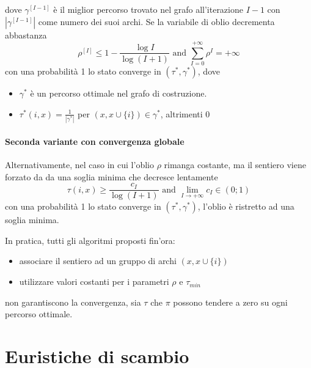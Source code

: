 \documentclass{article}
\begin{document}
dove $\gamma^{[I-1]}$ è il miglior percorso trovato nel grafo all'iterazione $I-1$ con
$|\gamma^{[I-1]}|$ come numero dei suoi archi. Se la variabile di oblio decrementa
abbastanza
$$\rho^{[I]}\leq 1-\frac{\log I}{\log (I+1)}\text{ and }\sum_{I=0}^{+\infty}\rho^{I}=+\infty$$
con una probabilità 1 lo stato converge in $(\tau^*,\gamma^*)$, dove
\begin{itemize}
    \item $\gamma^*$ è un percorso ottimale nel grafo di costruzione.
    \item $\tau^*(i,x)=\frac{1}{|\gamma^*|}$ per $(x,x\cup\{i\})\in\gamma^*$, altrimenti 0
\end{itemize}

\paragraph{Seconda variante con convergenza globale}
Alternativamente, nel caso in cui l'oblio $\rho$ rimanga costante, ma il sentiero viene forzato da
da una soglia minima che decresce lentamente
$$\tau(i,x)\geq\frac{c_I}{\log (I+1)}\text{ and }\lim_{I\rightarrow +\infty}c_I\in (0;1)$$
con una probabilità 1 lo stato converge in $(\tau^*,\gamma^*)$, l'oblio è ristretto
ad una soglia minima.

In pratica, tutti gli algoritmi proposti fin'ora:
\begin{itemize}
    \item associare il sentiero ad un gruppo di archi $(x,x\cup\{i\})$
    \item utilizzare valori costanti per i parametri $\rho$ e $\tau_{min}$
\end{itemize}
non garantiscono la convergenza, sia $\tau$ che $\pi$ possono tendere a zero su
ogni percorso ottimale.

\section{Euristiche di scambio}
\end{document}
